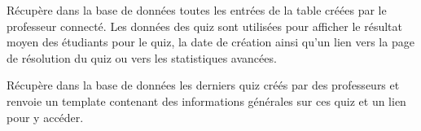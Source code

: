 \documentclass[a4,10pt,french]{sphinxmanual}
\begin{document}

\begin{fulllineitems}
\label{source:quiz.views.created_quizzes}
Récupère dans la base de données toutes les entrées de la table  créées
par le professeur connecté. Les données des quiz sont utilisées pour afficher
le résultat moyen des étudiants pour le quiz, la date de création ainsi qu'un lien vers la page de
résolution du quiz ou vers les statistiques avancées.

\end{fulllineitems}


\begin{fulllineitems}
\label{source:quiz.views.find}
Récupère dans la base de données les derniers quiz créés par des professeurs
et renvoie un template contenant des informations générales sur ces quiz et
un lien pour y accéder.

\end{fulllineitems}

\end{document}
